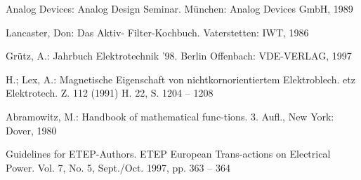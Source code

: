 \documentclass[10pt,a4paper,oneside,abstracton]{scrartcl}
\begin{document}
\begin{multicols}{2}
\begin{thebibliography}{9}

    Analog Devices: Analog Design 		Seminar.
 	München: Analog Devices GmbH,
  	1989

  	Lancaster, Don: Das Aktiv-			Filter-Kochbuch. Vaterstetten:  	IWT, 1986 

		
	Grütz, A.: Jahrbuch 				Elektrotechnik ’98. Berlin 			Offenbach: VDE-VERLAG, 				1997

	H.; Lex, A.: Magnetische 			Eigenschaft von 					nichtkornorientiertem 				Elektroblech. etz Elektrotech. 	Z. 112 (1991) H. 22, S. 1204 – 	1208
	
	Abramowitz, M.: Handbook of 		mathematical func-tions. 3. 			Aufl., New York: Dover, 1980
	
	Guidelines for ETEP-Authors. 		ETEP European Trans-actions on 	Electrical Power. Vol. 7, No. 		5, Sept./Oct. 1997, pp. 363 – 		364
  	
\end{thebibliography}

\end{multicols}
 
\end{document}
